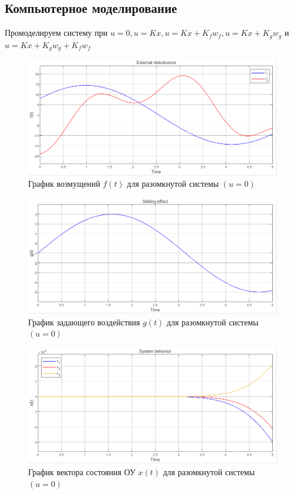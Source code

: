 \documentclass[a4paper, 12pt]{article}
\begin{document}
    \subsection{Компьютерное моделирование}
    Промоделируем систему при $u=0,u=Kx,u=Kx+K_fw_f,u=Kx+K_gw_g$ и $u=Kx+K_gw_g+K_fw_f$
    \begin{figure}[H]
        \centering
        \includegraphics[scale=0.6]{1task_f.png}
        \captionsetup{skip=0pt}
        \caption{График возмущений $f(t)$ для разомкнутой системы $\left( u=0 \right)$}
        \label{fig:1task_f}
    \end{figure}
    \begin{figure}[H]
        \centering
        \includegraphics[scale=0.6]{1task_g.png}
        \captionsetup{skip=0pt}
        \caption{График задающего воздействия $g(t)$ для разомкнутой системы $\left( u=0 \right)$}
        \label{fig:1task_g}
    \end{figure}
    \begin{figure}[H]
        \centering
        \includegraphics[scale=0.6]{1task_x.png}
        \captionsetup{skip=0pt}
        \caption{График вектора состояния ОУ $x(t)$ для разомкнутой системы $\left( u=0 \right)$}
        \label{fig:1task_x}
    \end{figure}
\end{document}
